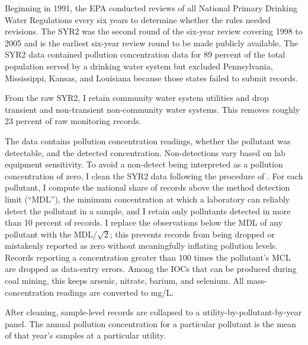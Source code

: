 \documentclass[12pt]{article}
\begin{document}
Beginning in 1991, the EPA conducted reviews of all National Primary Drinking Water Regulations every six years to determine whether the rules needed revisions. The SYR2 was the second round of the six-year review covering 1998 to 2005 and is the earliest six-year review round to be made publicly available. The SYR2 data contained pollution concentration data for 89 percent of the total population served by a drinking water system but excluded Pennsylvania, Mississippi, Kansas, and Louisiana because those states failed to submit records. %

From the raw SYR2, I retain community water system utilities and drop transient and non-transient non-community water systems. This removes roughly 23 percent of raw monitoring records.

The data contains pollution concentration readings, whether the pollutant was detectable, and the detected concentration. Non-detections vary based on lab equipment sensitivity. To avoid a non-detect being interpreted as a pollution concentration of zero, I clean the SYR2 data following the procedure of \textcite{ravalli2022sociodemographic}. For each pollutant, I compute the national share of records above the method detection limit (``MDL''), the minimum concentration at which a laboratory can reliably detect the pollutant in a sample, and I retain only pollutants detected in more than 10 percent of records. I replace the observations below the MDL of any pollutant with the MDL/$\sqrt{2}$; this prevents records from being dropped or mistakenly reported as zero without meaningfully inflating pollution levels. Records reporting a concentration greater than 100 times the pollutant's MCL are dropped as data-entry errors. Among the IOCs that can be produced during coal mining, this keeps arsenic, nitrate, barium, and selenium. All mass-concentration readings are converted to mg/L. 

After cleaning, sample-level records are collapsed to a utility-by-pollutant-by-year panel. The annual pollution concentration for a particular pollutant is the mean of that year's samples at a particular utility.
\end{document}
